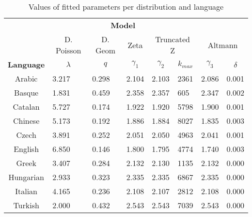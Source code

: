 \begin{table}[!htb]
\centering
\begin{tabular}{llllllll}
\multicolumn{1}{r}{\textbf{}} & \multicolumn{5}{c}{\textbf{Model}} \\ \cline{2-8} 
\multicolumn{1}{c}{\textbf{}} &
  \multicolumn{1}{c}{D. Poisson} &
  \multicolumn{1}{c}{D. Geom} &
  \multicolumn{1}{c}{Zeta} &
  \multicolumn{2}{c}{Truncated Z} &
  \multicolumn{2}{c}{Altmann} \\
\multicolumn{1}{c}{\textbf{Language}} &
  \multicolumn{1}{c}{$\lambda$} &
  \multicolumn{1}{c}{$q$} &
  \multicolumn{1}{c}{$\gamma_1$} &
  \multicolumn{1}{c}{$\gamma_2$} &
  \multicolumn{1}{c}{$k_{max}$}  &
  \multicolumn{1}{c}{$\gamma_3$} &
  \multicolumn{1}{c}{$\delta$} \\ \hline
\multicolumn{1}{c}{Arabic} & 3.217 & 0.298 & 2.104 & 2.103 & 2361  & 2.086 & 0.001  \\
\multicolumn{1}{c}{Basque} & 1.831 & 0.459 & 2.358 & 2.357 & 605  & 2.347 & 0.002  \\
\multicolumn{1}{c}{Catalan} & 5.727 & 0.174 & 1.922 & 1.920 & 5798  & 1.900 & 0.001  \\
\multicolumn{1}{c}{Chinese} & 5.173 & 0.192 & 1.886 & 1.884 & 8027  & 1.835 & 0.003  \\
\multicolumn{1}{c}{Czech} & 3.891 & 0.252 & 2.051 & 2.050 & 4963  & 2.041 & 0.001  \\
\multicolumn{1}{c}{English} & 6.850 & 0.146 & 1.800 & 1.795 & 4774  & 1.740 & 0.003  \\
\multicolumn{1}{c}{Greek} & 3.407 & 0.284 & 2.132 & 2.130 & 1135  & 2.132 & 0.000  \\
\multicolumn{1}{c}{Hungarian} & 2.933 & 0.323 & 2.335 & 2.335 & 6867  & 2.335 & 0.000  \\
\multicolumn{1}{c}{Italian} & 4.165 & 0.236 & 2.108 & 2.107 & 2812  & 2.108 & 0.000  \\
\multicolumn{1}{c}{Turkish} & 2.000 & 0.432 & 2.543 & 2.543 & 7039  & 2.543 & 0.000  \\
\end{tabular}
\caption{Values of fitted parameters per distribution and language} \label{tab:fitted}
\end{table}